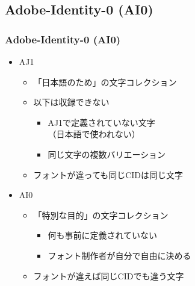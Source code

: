 \subsection{Adobe-Identity-0 (AI0)}
\begin{frame}\frametitle{Adobe-Identity-0 (AI0)}
  \begin{itemize}
  \item AJ1
    \begin{itemize}
    \item 「日本語のため」の文字コレクション
    \item 以下は収録できない
      \begin{itemize}
      \item AJ1で定義されていない文字\\
        （日本語で使われない）
      \item 同じ文字の複数バリエーション
      \end{itemize}
    \item フォントが違っても同じCIDは同じ文字
    \end{itemize}
  \item AI0
    \begin{itemize}
    \item 「特別な目的」の文字コレクション
      \begin{itemize}
      \item 何も事前に定義されていない
      \item フォント制作者が自分で自由に決める
      \end{itemize}
    \item フォントが違えば同じCIDでも違う文字
    \end{itemize}
  \end{itemize}
\end{frame}

